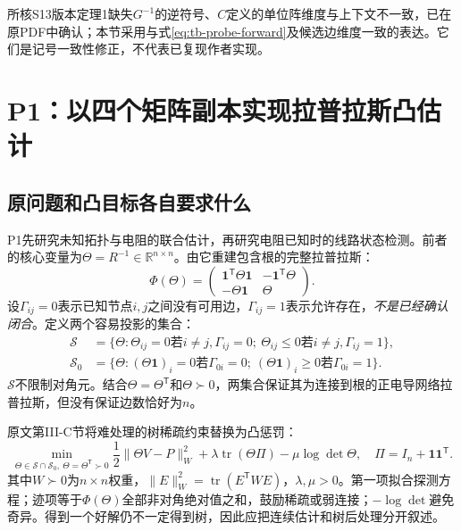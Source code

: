 所核S13版本定理1缺失$G^{-1}$的逆符号、$C$定义的单位阵维度与上下文不一致，已在原PDF中确认；本节采用与式\eqref{eq:tb-probe-forward}及候选边维度一致的表达。它们是记号一致性修正，不代表已复现作者实现。


\section{P1：以四个矩阵副本实现拉普拉斯凸估计}
\label{sec:tb-P1}

\subsection{原问题和凸目标各自要求什么}

P1\citep{P1}先研究未知拓扑与电阻的联合估计，再研究电阻已知时的线路状态检测。前者的核心变量为$\Theta=R^{-1}\in\mathbb R^{n\times n}$。由它重建包含根的完整拉普拉斯：
\begin{equation}
 \Phi(\Theta)=
 \begin{pmatrix}
 \mathbf1^{\mathsf T}\Theta\mathbf1&-\mathbf1^{\mathsf T}\Theta\\
 -\Theta\mathbf1&\Theta
 \end{pmatrix}.
 \label{eq:tb-P1-full}
\end{equation}
设$\Gamma_{ij}=0$表示已知节点$i,j$之间没有可用边，$\Gamma_{ij}=1$表示允许存在，\emph{不是已经确认闭合}。定义两个容易投影的集合：
\begin{align}
 \mathcal S&=\{\Theta:\Theta_{ij}=0\text{若}i\ne j,\Gamma_{ij}=0;\
                  \Theta_{ij}\leq0\text{若}i\ne j,\Gamma_{ij}=1\},\\
 \mathcal S_0&=\{\Theta:(\Theta\mathbf1)_i=0\text{若}\Gamma_{0i}=0;\
                  (\Theta\mathbf1)_i\geq0\text{若}\Gamma_{0i}=1\}.
\end{align}
$\mathcal S$不限制对角元。结合$\Theta=\Theta^{\mathsf T}$和$\Theta\succ0$，两集合保证其为连接到根的正电导网络拉普拉斯，但没有保证边数恰好为$n$。

原文第III-C节将难处理的树稀疏约束替换为凸惩罚：
\begin{equation}
 \min_{\Theta\in\mathcal S\cap\mathcal S_0,\ \Theta=\Theta^{\mathsf T}\succ0}
 \frac12\|\Theta V-P\|_W^2+
 \lambda\operatorname{tr}(\Theta\Pi)-\mu\log\det\Theta,
 \quad \Pi=I_n+\mathbf1\mathbf1^{\mathsf T}.
 \label{eq:tb-P1-objective}
\end{equation}
其中$W\succ0$为$n\times n$权重，$\|E\|_W^2=\operatorname{tr}(E^{\mathsf T}WE)$，$\lambda,\mu>0$。第一项拟合探测方程；迹项等于$\Phi(\Theta)$全部非对角绝对值之和，鼓励稀疏或弱连接；$-\log\det$避免奇异。得到一个好解仍不一定得到树，因此应把连续估计和树后处理分开叙述。

